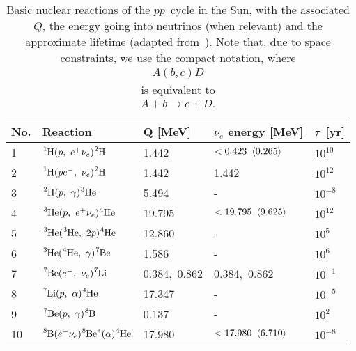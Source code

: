 \bgroup
\def\arraystretch{1.25}
\begin{table}[!htbp]
  \begin{tabular}{lllll}
    \hline
    No. & Reaction & Q [MeV] & $\nu_e$ energy [MeV] & $\tau$~[yr]\\
    \hline
    \hline
    1 & $\ce{^1H} (p,~e^+ \nu_e) \ce{^2H}$ & 1.442 & $< 0.423~\left<0.265\right>$ & $10^{10}$\\
    2 & $\ce{^1H} (pe^-,~\nu_e) \ce{^2H}$ & 1.442 & 1.442 & $10^{12}$\\
    3 & $\ce{^2H} (p,~\gamma) \ce{^3He}$ & 5.494 & - & $10^{-8}$\\
    4 & $\ce{^3He} (p,~e^+ \nu_e) \ce{^4He}$ & 19.795 & $< 19.795~\left<9.625\right>$ & $10^{12}$\\
    5 & $\ce{^3He} (\ce{^3He},~2p) \ce{^4He}$ & 12.860 & - & $10^{5}$\\
    6 & $\ce{^3He} (\ce{^4He},~\gamma) \ce{^7Be}$ & 1.586 & - & $10^{6}$\\
    7 & $\ce{^7Be} (e^-,~\nu_e) \ce{^7Li}$ & 0.384,~0.862 & 0.384,~0.862 & $10^{-1}$\\
    8 & $\ce{^7Li} (p,~\alpha) \ce{^4He}$ & 17.347 & - & $10^{-5}$\\
    9 & $\ce{^7Be} (p,~\gamma) \ce{^8B}$ & 0.137 & - & $10^{2}$\\
    10 & $\ce{^8B} (e^+ \nu_e) \ce{^8Be}^* (\alpha) \ce{^4He}$ & 17.980 & $< 17.980~\left<6.710\right>$ & $10^{-8}$\\
    \hline
  \end{tabular}
  \caption{Basic nuclear reactions of the $pp$~cycle in the Sun, with the associated
  $Q$, the energy going into neutrinos (when relevant) and the approximate lifetime
  (adapted from~\cite{1988RvMP...60..297B}). Note that, due to space constraints,
  we use the compact notation, where
  \begin{align*}
    A (b, c) D
  \end{align*}
  is equivalent to
  \begin{align*}
    A + b \rightarrow c + D.
  \end{align*}}
  \label{tab:pp_cycle}
\end{table}
\egroup

